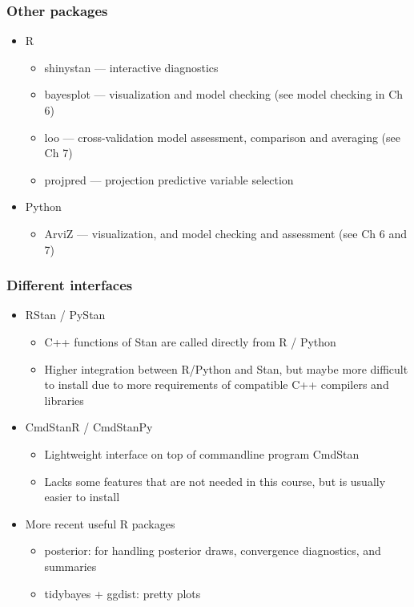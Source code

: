 \documentclass[10pt]{beamer}
\begin{document}
\begin{frame}[fragile]

\frametitle{Other packages}

  \begin{itemize}
  \item R
    \begin{itemize}
    \item shinystan --- interactive diagnostics
    \item bayesplot --- visualization and model checking (see model checking in Ch 6)
    \item loo --- cross-validation model assessment, comparison and averaging (see Ch 7)
    \item projpred --- projection predictive variable selection
    \end{itemize}
    \vspace{\baselineskip}
  \item Python
    \begin{itemize}
    \item ArviZ --- visualization, and model checking and assessment (see Ch 6 and 7)
    \end{itemize}
  \end{itemize}

\end{frame}

\begin{frame}[fragile]

\frametitle{Different interfaces}

  \begin{itemize}
  \item RStan / PyStan
    \begin{itemize}
    \item C++ functions of Stan are called directly from R / Python
    \item Higher integration between R/Python and Stan, but maybe more
      difficult to install due to more requirements of compatible C++
      compilers and libraries
    \end{itemize}
  \item CmdStanR / CmdStanPy
    \begin{itemize}
    \item Lightweight interface on top of commandline program CmdStan
    \item Lacks some features that are not needed in this course, but
      is usually easier to install
    \end{itemize}
  \item More recent useful R packages
    \begin{itemize}
    \item posterior: for handling posterior draws, convergence diagnostics, and summaries
    \item tidybayes + ggdist: pretty plots
    \end{itemize}
  \end{itemize}

\end{frame}
\end{document}
